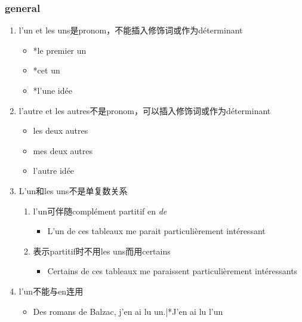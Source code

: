 \documentclass[UTF8]{report}
\begin{document}
\subsubsection{general}
\begin{enumerate}
    \item l’un et les uns是pronom，不能插入修饰词或作为déterminant
    \begin{itemize}
        \item *le premier un
        \item *cet un
        \item *l’une idée
    \end{itemize}
    \item l’autre et les autres不是pronom，可以插入修饰词或作为déterminant
    \begin{itemize}
        \item les deux autres
        \item mes deux autres
        \item l’autre idée
    \end{itemize}
    \item L’un和les uns不是单复数关系
    \begin{enumerate}
        \item l’un可伴随complément partitif en \textit{de}
        \begin{itemize}
            \item L’un de ces tableaux me parait particulièrement intéressant
        \end{itemize}
        \item 表示partitif时不用les uns而用certains
        \begin{itemize}
            \item Certains de ces tableaux me paraissent particulièrement intéressants
        \end{itemize}
    \end{enumerate}
    \item l'un不能与en连用
    \begin{itemize}
        \item Des romans de Balzac, j’en ai lu un.|*J’en ai lu l’un
    \end{itemize}
\end{enumerate}
\end{document}
